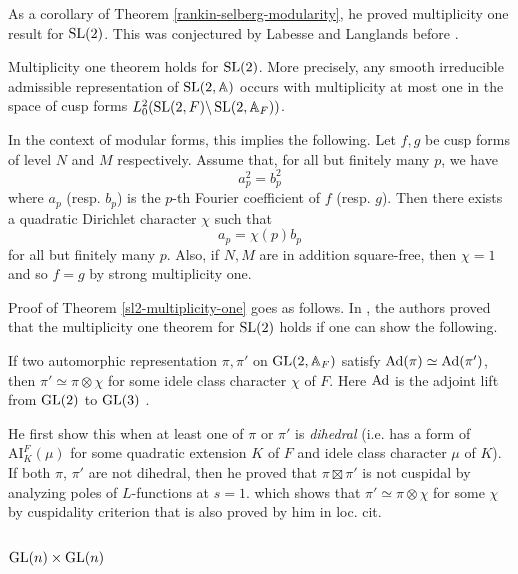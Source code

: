As a corollary of Theorem \ref{rankin-selberg-modularity}, he proved multiplicity one result for $\operatorname{\mathrm{SL}}(2)$.
This was conjectured by Labesse and Langlands before \cite{labesse1979indistinguishability}.
\begin{theorem}
\label{sl2-multiplicity-one}
Multiplicity one theorem holds for $\operatorname{\mathrm{SL}}(2)$. 
More precisely, any smooth irreducible admissible representation of $\operatorname{\mathrm{SL}}(2, \mathbb{A})$ occurs with 
multiplicity at most one in the space of cusp forms $L^{2}_{0}(\operatorname{\mathrm{SL}}(2, F)\backslash\operatorname{\mathrm{SL}}(2, \mathbb{A}_{F}))$.
\end{theorem}
In the context of modular forms, this implies the following.
Let $f, g$ be cusp forms of level $N$ and $M$ respectively.
Assume that, for all but finitely many $p$, we have
$$
    a_{p}^{2} = b_{p}^{2}
$$
where $a_{p}$ (resp. $b_{p}$) is the $p$-th Fourier coefficient of $f$ (resp. $g$).
Then there exists a quadratic Dirichlet character $\chi$ such that
$$
    a_{p} = \chi(p)b_{p}
$$
for all but finitely many $p$.
Also, if $N, M$ are in addition square-free, then $\chi = 1$ and so $f = g$ by strong multiplicity one.

Proof of Theorem \ref{sl2-multiplicity-one} goes as follows. 
In \cite{labesse1979indistinguishability}, the authors proved that the multiplicity one theorem for $\operatorname{\mathrm{SL}}(2)$ 
holds if one can show the following.
\begin{theorem}
If two automorphic representation $\pi, \pi'$ on $\operatorname{\mathrm{GL}}(2, \mathbb{A}_{F})$ satisfy
$\operatorname{\mathrm{Ad}}(\pi)\simeq \operatorname{\mathrm{Ad}}(\pi')$, then $\pi' \simeq \pi \otimes \chi$ for some idele class character $\chi$ of $F$.
Here $\operatorname{\mathrm{Ad}}$ is the adjoint lift from $\operatorname{\mathrm{GL}}(2)$ to $\operatorname{\mathrm{GL}}(3)$ \cite{gelbart1976relation}.
\end{theorem}
He first show this when at least one of $\pi$ or $\pi'$ is \emph{dihedral} (i.e. has a form of $\mathrm{AI}_{K}^{F}(\mu)$ for some 
quadratic extension $K$ of $F$ and idele class character $\mu$ of $K$).
If both $\pi$, $\pi'$ are not dihedral, then he proved that $\pi \boxtimes \pi'$ is not cuspidal by
analyzing poles of $L$-functions at $s = 1$.
which shows that $\pi' \simeq \pi \otimes \chi$ for some $\chi$ by cuspidality criterion that is also proved by him in loc. cit.


\subsection{$\operatorname{\mathrm{GL}}(n)\times \operatorname{\mathrm{GL}}(n)$}

